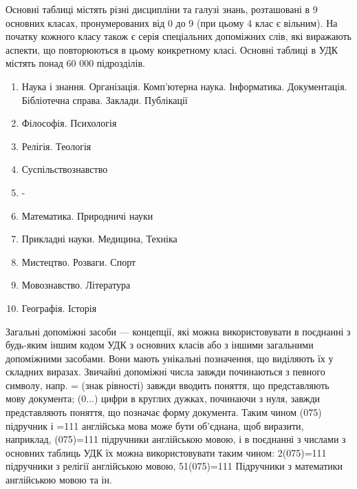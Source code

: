 \documentclass[14pt]{extarticle}
\begin{document}
  Основні таблиці \cite{udc_structure_and_tables} містять різні дисципліни та галузі знань,
  розташовані в 9 основних класах, пронумерованих від 0 до 9
  (при цьому 4 клас є вільним).
  На початку кожного класу також є серія спеціальних допоміжних слів,
  які виражають аспекти, що повторюються в цьому конкретному класі.
  Основні таблиці в УДК містять понад 60 000 підрозділів.
  \begin{enumerate}
      [labelindent=\dimexpr\parindent*2\relax, leftmargin=*, start=0]
    \item Наука і знання.
    Організація.
    Комп'ютерна наука.
    Інформатика.
    Документація.
    Бібліотечна справа.
    Заклади.
    Публікації
    \item Філософія. Психологія
    \item Релігія. Теологія
    \item Суспільствознавство
    \item -
    \item Математика. Природничі науки
    \item Прикладні науки. Медицина, Техніка
    \item Мистецтво. Розваги. Спорт
    \item Мовознавство. Література
    \item Географія. Історія
  \end{enumerate}

  Загальні допоміжні засоби — концепції,
  які можна використовувати в поєднанні
  з будь-яким іншим кодом УДК з основних класів
  або з іншими загальними допоміжними засобами.
  Вони мають унікальні позначення, що виділяють їх у складних виразах.
  Звичайні допоміжні числа завжди починаються з певного символу,
  напр. = (знак рівності) завжди вводить поняття,
  що представляють мову документа;
  (0...) цифри в круглих дужках, починаючи з нуля,
  завжди представляють поняття, що позначає форму документа.
  Таким чином (075) підручник і =111 англійська мова може бути об’єднана,
  щоб виразити, наприклад, (075)=111 підручники англійською мовою,
  і в поєднанні з числами з основних таблиць
  УДК їх можна використовувати таким чином:
  2(075)=111 підручники з релігії англійською мовою,
  51(075)=111 Підручники з математики англійською мовою та ін.
\end{document}
